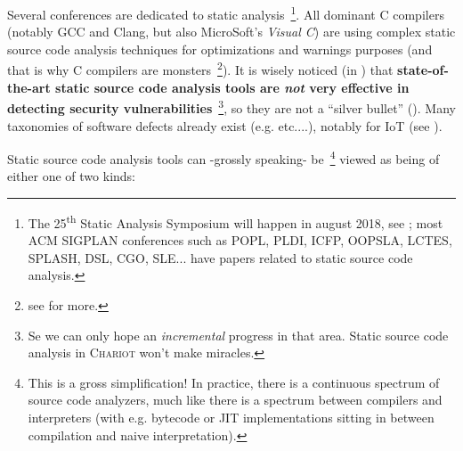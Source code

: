 Several conferences are dedicated to static analysis~\footnote{The
  25\textsuperscript{th} Static Analysis Symposium will happen in
  august 2018, see
  ; most ACM
  SIGPLAN conferences such as POPL, PLDI, ICFP, OOPSLA, LCTES, SPLASH,
  DSL, CGO, SLE... have papers related to static source code
  analysis.}.  All dominant C compilers (notably GCC and Clang, but
also MicroSoft's \emph{Visual C}\texttrademark) are using complex
static source code analysis techniques for optimizations and warnings
purposes (and that is why C compilers are monsters~\footnote{see
  for more.}). It is wisely noticed (in
\cite{GosevaPopstojanova2015OnTC}) that \textbf{state-of-the-art
  static source code analysis tools are \emph{not} very effective in
  detecting  security
  vulnerabilities}~\footnote{Se we can only hope an \emph{incremental}
  progress in that area. Static source code analysis in
  \textsc{Chariot} won't make miracles.}, so they are not a ``silver
bullet''  (\cite{Brooks:1987:NSB}). Many
taxonomies of software defects  already exist
(e.g. \cite{Silva:2016:SES, Wagner:2008:DCD, Levine:2009:DDE}
etc....), notably for IoT (see \cite{Carpent:2018:RRA,
  Ahmad:2018:ModelBasedIoT, Laszlo:2018:Vessedia}).

Static source code analysis tools can -grossly speaking-
be~\footnote{This is a gross simplification! In practice, there is a
  continuous spectrum of source code analyzers, much like there is a
  spectrum between compilers and interpreters (with e.g. bytecode or
  JIT implementations sitting in between compilation and naive
  interpretation).} viewed as being of either one of two kinds:

